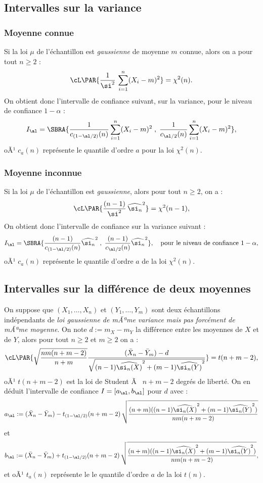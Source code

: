 \subsection{Intervalles sur la variance} 


\subsubsection{Moyenne connue} 

Si la loi $\mu$ de l'échantillon est \emph{gaussienne} de moyenne $m$ connue,
alors on a pour tout $n \geq 2$ :
$$
\cL\PAR{\frac{1}{\si^2}\,\sum_{i=1}^n (X_i-m)^2}= \chi^2 (n).
$$
On obtient donc l'intervalle de confiance suivant, sur la variance, pour le
niveau de confiance $1-\alpha$ :
$$
I_\al=\SBRA{\frac{1}{c_{(1-\al/2)}(n)}\sum_{i=1}^n (X_i-m)^2\;,\;
  \frac{1}{c_{\al/2}(n)}\sum_{i=1}^n (X_i-m)^2},
$$
oÃ¹ $c_a(n)$ représente le quantile d'ordre $a$ pour la loi $\chi^2(n)$.

\subsubsection{Moyenne inconnue} 

Si la loi $\mu$ de l'échantillon est \emph{gaussienne}, alors
pour tout $n \geq 2$, on a :
$$
\cL\PAR{\frac{(n-1)}{\si^2}\,\widehat{\si_n}^2} = \chi^2 (n-1),
$$
On obtient donc l'intervalle de confiance sur la variance suivant :
$$
I_\al=\SBRA{\frac{(n-1)}{c_{(1-\al/2)}(n)}\widehat{\si_n}^2\;,\; 
  \frac{(n-1)}{c_{\al/2}(n)}\widehat{\si_n}^2},
\text{\quad pour le niveau de confiance $1-\alpha$},
$$
oÃ¹ $c_a(n)$ représente le quantile d'ordre $a$ de la loi $\chi^2(n)$.

\subsection{Intervalles sur la différence de deux moyennes}

On suppose que $(X_1,\ldots,X_n)$ et $(Y_1,\ldots,Y_m)$ sont deux échantillons
indépendants de \emph{loi gaussienne de mÃªme variance mais pas forcément de
  mÃªme moyenne}. On note $d:=m_X-m_Y$ la différence entre les moyennes de $X$
et de $Y$, alors pour tout $n \geq 2$ et $m \geq 2$ on a :
$$ 
\cL\PAR{
\sqrt{\frac{nm(n+m-2)}{n+m}} 
\frac{(\bar{X}_n-\bar{Y}_m)-d}
{\sqrt{(n-1)\widehat{\si_n(X)}^2+(m-1)\widehat{\si_n(Y)}^2}}}
=t(n+m-2),
$$
oÃ¹ $t(n+m-2)$ est la loi de Student Ã  $n+m-2$ degrés de liberté. On en
déduit l'intervalle de confiance $I=[a_\al,b_\al]$ pour $d$ avec :
$$
a_\al:=(\bar{X}_n-\bar{Y}_m)-t_{(1-\al/2)}(n+m-2)\,
       \sqrt{\frac{(n+m)((n-1)\widehat{\si_n(X)}^2
                     +(m-1)\widehat{\si_n(Y)}^2)}{nm(n+m-2)}}
$$
et
$$
b_\al:=(\bar{X}_n -\bar{Y}_m)+t_{(1-\al/2)}(n+m-2)\,
       \sqrt{\frac{(n+m)((n-1)\widehat{\si_n(X)}^2
                   +(m-1)\widehat{\si_n(Y)}^2)}{nm(n+m-2)}},
$$
et oÃ¹ $t_a(n)$ représente le le quantile d'ordre $a$ de la loi $t(n)$.


